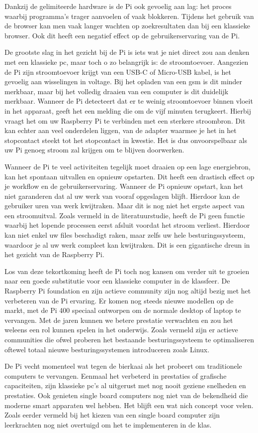 Dankzij de gelimiteerde hardware is de Pi ook gevoelig aan lag: het proces waarbij programma's trager aanvoelen of vaak blokkeren. Tijdens het gebruik van de browser kan men vaak langer wachten op zoekresultaten dan bij een klassieke browser. Ook dit heeft een negatief effect op de gebruikerservaring van de Pi.

De grootste slag in het gezicht bij de Pi is iets wat je niet direct zou aan denken met een klassieke pc, maar toch o zo belangrijk is: de stroomtoevoer. Aangezien de Pi zijn stroomtoevoer krijgt van een USB-C of Micro-USB kabel, is het gevoelig aan wisselingen in voltage. Bij het opladen van een gsm is dit minder merkbaar, maar bij het volledig draaien van een computer is dit duidelijk merkbaar. Wanneer de Pi detecteert dat er te weinig stroomtoevoer binnen vloeit in het apparaat, geeft het een melding die om de vijf minuten terugkeert. Hierbij vraagt het om uw Raspberry Pi te verbinden met een sterkere stroombron. Dit kan echter aan veel onderdelen liggen, van de adapter waarmee je het in het stopcontact steekt tot het stopcontact in kwestie. Het is dus onvoorspelbaar als uw Pi genoeg stroom zal krijgen om te blijven doorwerken.

Wanneer de Pi te veel activiteiten tegelijk moet draaien op een lage energiebron, kan het spontaan uitvallen en opnieuw opstarten. Dit heeft een drastisch effect op je workflow en de gebruikerservaring. Wanneer de Pi opnieuw opstart, kan het niet garanderen dat al uw werk van vooraf opgeslagen blijft. Hierdoor kan de gebruiker uren van werk kwijtraken. 
Maar dit is nog niet het ergste aspect van een stroomuitval. Zoals vermeld in de literatuurstudie, heeft de Pi geen functie waarbij het lopende processen eerst afsluit voordat het stroom verliest. Hierdoor kan niet enkel uw files beschadigt raken, maar zelfs uw hele besturingssysteem, waardoor je al uw werk compleet kan kwijtraken. Dit is een gigantische dreun in het gezicht van de Raspberry Pi.  

Los van deze tekortkoming heeft de Pi toch nog kansen om verder uit te groeien naar een goede substitutie voor een klassieke computer in de klassfeer. De Raspberry Pi foundation en zijn actieve community zijn nog altijd bezig met het verbeteren van de Pi ervaring. Er komen nog steeds nieuwe modellen op de markt, met de Pi 400 speciaal ontworpen om de normale desktop of laptop te vervangen. Met de jaren kunnen we betere prestatie verwachten en zou het weleens een rol kunnen spelen in het onderwijs.
Zoals vermeld zijn er actieve communities die ofwel proberen het bestaande besturingssysteem te optimaliseren oftewel totaal nieuwe besturingssystemen introduceren zoals Linux. 

De Pi vecht momenteel wat tegen de bierkaai als het probeert om traditionele computers te vervangen. Eenmaal het verbeterd in prestaties of grafische capaciteiten, zijn klassieke pc's al uitgerust met nog nooit geziene snelheden en prestaties. Ook genieten single board computers nog niet van de bekendheid die moderne smart apparaten wel hebben. Het blijft een wat nich concept voor velen. Zoals eerder vermeld bij het kiezen van een single board computer zijn leerkrachten nog niet overtuigd om het te implementeren in de klas.




